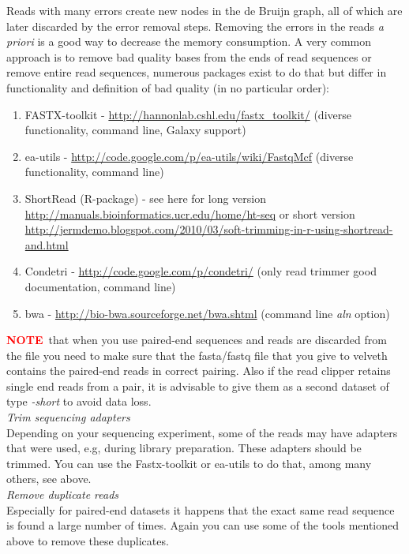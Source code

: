 \documentclass[12pt]{article}
\newcommand{\NOTE}{\textcolor{red}{\textbf{NOTE}}}
\begin{document}
Reads with many errors create new nodes in the de Bruijn graph, all of which are later discarded by the error removal steps. Removing the errors in the reads \emph{a priori} is a good way to decrease the memory consumption.  A very common approach is to remove bad quality bases from the ends of read sequences or remove entire read sequences, numerous packages exist to do that but differ in functionality and definition of bad quality  (in no particular order):
\begin{enumerate}
\item  FASTX-toolkit - \url{http://hannonlab.cshl.edu/fastx_toolkit/}  (diverse functionality, command line, Galaxy support)
\item ea-utils - \url{http://code.google.com/p/ea-utils/wiki/FastqMcf} (diverse functionality, command line)
\item ShortRead (R-package) -  see here for long version \url{http://manuals.bioinformatics.ucr.edu/home/ht-seq} or short version \url{http://jermdemo.blogspot.com/2010/03/soft-trimming-in-r-using-shortread-and.html}
\item Condetri - \url{http://code.google.com/p/condetri/} (only read trimmer good documentation, command line)
\item bwa - \url{http://bio-bwa.sourceforge.net/bwa.shtml} (command line \emph{aln} option)
\end{enumerate}

\NOTE \  that when you use paired-end sequences and reads are discarded from the file you need to make sure that the fasta/fastq file that you give to velveth contains the paired-end reads in correct pairing. Also if the read clipper retains single end reads from a pair, it is advisable to give them as a second dataset of type \emph{-short} to avoid data loss.\\

\emph{Trim sequencing adapters} \\

Depending on your sequencing experiment, some of the reads may have adapters that were used, e.g, during library preparation. These adapters should be trimmed. You can use the Fastx-toolkit or ea-utils to do that, among many others, see above.\\

\emph{Remove duplicate reads} \\

Especially for paired-end datasets it happens that the exact same read sequence is found a large number of times. Again you can use some of the tools mentioned above to remove these duplicates.
\end{document}
